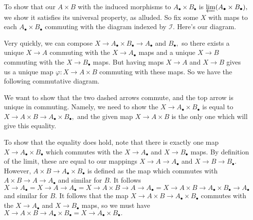 To show that our $A\times B$ with the induced morphisms to $A_\bullet\times B_\bullet$ is $\varprojlim(A_\bullet\times B_\bullet),$ we show it satisfies its universal property, as alluded. So fix some $X$ with maps to each $A_\bullet\times B_\bullet$ commuting with the diagram indexed by $\mathcal I.$ Here's our diagram.
\begin{center}
\end{center}
Very quickly, we can compose $X\to A_\bullet\times B_\bullet\to A_\bullet$ and $B_\bullet,$ so there exists a unique $X\to A$ commuting with the $X\to A_\bullet$ maps and a unique $X\to B$ commuting with the $X\to B_\bullet$ maps. But having maps $X\to A$ and $X\to B$ gives us a unique map $\varphi:X\to A\times B$ commuting with these maps. So we have the following commutative diagram.
\begin{center}
\end{center}
We want to show that the two dashed arrows commute, and the top arrow is unique in commuting. Namely, we need to show the $X\to A_\bullet\times B_\bullet$ is equal to $X\to A\times B\to A_\bullet\times B_\bullet,$ and the given map $X\to A\times B$ is the only one which will give this equality.

To show that the equality does hold, note that there is exactly one map $X\to A_\bullet\times B_\bullet$ which commutes with the $X\to A_\bullet$ and $X\to B_\bullet$ maps. By definition of the limit, these are equal to our mappings $X\to A\to A_\bullet$ and $X\to B\to B_\bullet.$ However, $A\times B\to A_\bullet\times B_\bullet$ is defined as the map which commutes with $A\times B\to A\to A_\bullet$ and similar for $B.$ It follows
\[X\to A_\bullet=X\to A\to A_\bullet=X\to A\times B\to A\to A_\bullet=X\to A\times B\to A_\bullet\times B_\bullet\to A_\bullet\]
and similar for $B.$ It follows that the map $X\to A\times B\to A_\bullet\times B_\bullet$ commutes with the $X\to A_\bullet$ and $X\to B_\bullet$ maps, so we must have $X\to A\times B\to A_\bullet\times B_\bullet=X\to A_\bullet\times B_\bullet.$

